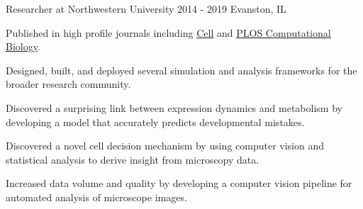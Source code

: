 \begin{cventries}
  \cventrynew
	{Researcher at Northwestern University}    
    {2014 - 2019} 
    {Evanston, IL} 
    { \begin{cvitems}	
		\item {Published in high profile journals including \href{https://doi.org/10.1016/j.cell.2019.06.023}{Cell} and \href{https://doi.org/10.1371/journal.pcbi.1007406}{PLOS Computational Biology}.}
		\item {Designed, built, and deployed several simulation and analysis frameworks for the broader research community.}
		\item {Discovered a surprising link between expression dynamics and metabolism by developing a model that accurately predicts developmental mistakes.}
		\item {Discovered a novel cell decision mechanism by using computer vision and statistical analysis to derive insight from microscopy data.}
		\item {Increased data volume and quality by developing a computer vision pipeline for automated analysis of microscope images.}		
	  \end{cvitems}
     }
     


\end{cventries}
